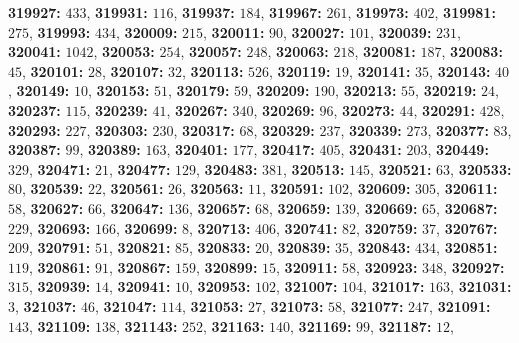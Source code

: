 \textsf{\bfseries 319927:} $433$, \textsf{\bfseries 319931:} $116$, \textsf{\bfseries 319937:} $184$, \textsf{\bfseries 319967:} $261$, \textsf{\bfseries 319973:} $402$, \textsf{\bfseries 319981:} $275$, \textsf{\bfseries 319993:} $434$, \textsf{\bfseries 320009:} $215$, \textsf{\bfseries 320011:} $90$, \textsf{\bfseries 320027:} $101$, \textsf{\bfseries 320039:} $231$, \textsf{\bfseries 320041:} $1042$, \textsf{\bfseries 320053:} $254$, \textsf{\bfseries 320057:} $248$, \textsf{\bfseries 320063:} $218$, \textsf{\bfseries 320081:} $187$, \textsf{\bfseries 320083:} $45$, \textsf{\bfseries 320101:} $28$, \textsf{\bfseries 320107:} $32$, \textsf{\bfseries 320113:} $526$, \textsf{\bfseries 320119:} $19$, \textsf{\bfseries 320141:} $35$, \textsf{\bfseries 320143:} $40$, \textsf{\bfseries 320149:} $10$, \textsf{\bfseries 320153:} $51$, \textsf{\bfseries 320179:} $59$, \textsf{\bfseries 320209:} $190$, \textsf{\bfseries 320213:} $55$, \textsf{\bfseries 320219:} $24$, \textsf{\bfseries 320237:} $115$, \textsf{\bfseries 320239:} $41$, \textsf{\bfseries 320267:} $340$, \textsf{\bfseries 320269:} $96$, \textsf{\bfseries 320273:} $44$, \textsf{\bfseries 320291:} $428$, \textsf{\bfseries 320293:} $227$, \textsf{\bfseries 320303:} $230$, \textsf{\bfseries 320317:} $68$, \textsf{\bfseries 320329:} $237$, \textsf{\bfseries 320339:} $273$, \textsf{\bfseries 320377:} $83$, \textsf{\bfseries 320387:} $99$, \textsf{\bfseries 320389:} $163$, \textsf{\bfseries 320401:} $177$, \textsf{\bfseries 320417:} $405$, \textsf{\bfseries 320431:} $203$, \textsf{\bfseries 320449:} $329$, \textsf{\bfseries 320471:} $21$, \textsf{\bfseries 320477:} $129$, \textsf{\bfseries 320483:} $381$, \textsf{\bfseries 320513:} $145$, \textsf{\bfseries 320521:} $63$, \textsf{\bfseries 320533:} $80$, \textsf{\bfseries 320539:} $22$, \textsf{\bfseries 320561:} $26$, \textsf{\bfseries 320563:} $11$, \textsf{\bfseries 320591:} $102$, \textsf{\bfseries 320609:} $305$, \textsf{\bfseries 320611:} $58$, \textsf{\bfseries 320627:} $66$, \textsf{\bfseries 320647:} $136$, \textsf{\bfseries 320657:} $68$, \textsf{\bfseries 320659:} $139$, \textsf{\bfseries 320669:} $65$, \textsf{\bfseries 320687:} $229$, \textsf{\bfseries 320693:} $166$, \textsf{\bfseries 320699:} $8$, \textsf{\bfseries 320713:} $406$, \textsf{\bfseries 320741:} $82$, \textsf{\bfseries 320759:} $37$, \textsf{\bfseries 320767:} $209$, \textsf{\bfseries 320791:} $51$, \textsf{\bfseries 320821:} $85$, \textsf{\bfseries 320833:} $20$, \textsf{\bfseries 320839:} $35$, \textsf{\bfseries 320843:} $434$, \textsf{\bfseries 320851:} $119$, \textsf{\bfseries 320861:} $91$, \textsf{\bfseries 320867:} $159$, \textsf{\bfseries 320899:} $15$, \textsf{\bfseries 320911:} $58$, \textsf{\bfseries 320923:} $348$, \textsf{\bfseries 320927:} $315$, \textsf{\bfseries 320939:} $14$, \textsf{\bfseries 320941:} $10$, \textsf{\bfseries 320953:} $102$, \textsf{\bfseries 321007:} $104$, \textsf{\bfseries 321017:} $163$, \textsf{\bfseries 321031:} $3$, \textsf{\bfseries 321037:} $46$, \textsf{\bfseries 321047:} $114$, \textsf{\bfseries 321053:} $27$, \textsf{\bfseries 321073:} $58$, \textsf{\bfseries 321077:} $247$, \textsf{\bfseries 321091:} $143$, \textsf{\bfseries 321109:} $138$, \textsf{\bfseries 321143:} $252$, \textsf{\bfseries 321163:} $140$, \textsf{\bfseries 321169:} $99$, \textsf{\bfseries 321187:} $12$, 
